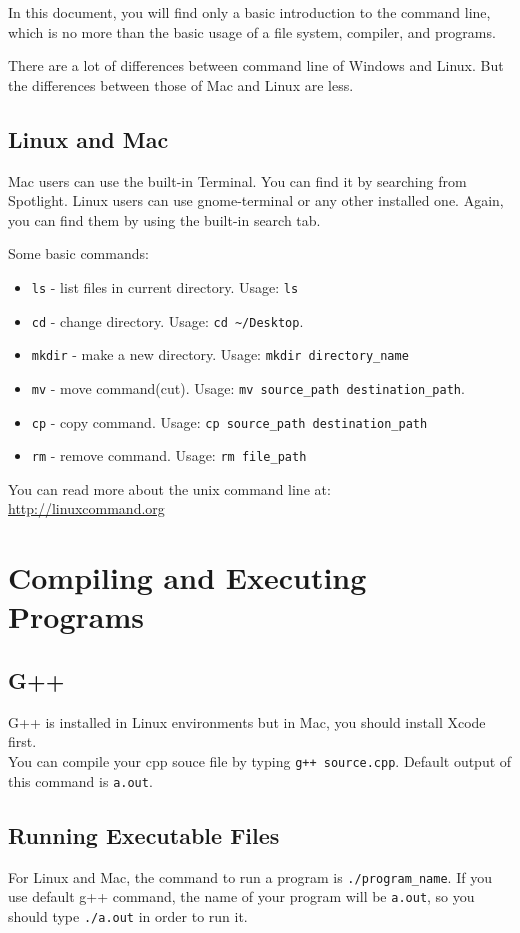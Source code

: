 \documentclass[12pt]{article}
\begin{document}
In this document, you will find only a basic introduction to the command line, which is no more than the basic usage of a file system, compiler, and programs.

There are a lot of differences between command line of Windows and Linux. But the differences between those of Mac and Linux are less.

\subsection{Linux and Mac}
Mac users can use the built-in Terminal. You can find it by searching from Spotlight. Linux users can use gnome-terminal or any other installed one. Again, you can find them by using the built-in search tab.

Some basic commands:
\begin{itemize}
  \item \texttt{ls} - list files in current directory. Usage: \texttt{ls}
  \item \texttt{cd} - change directory. Usage: \texttt{cd \textasciitilde/Desktop}.
  \item \texttt{mkdir} - make a new directory. Usage: \texttt{mkdir directory\_name}
  \item \texttt{mv} - move command(cut). Usage: \texttt{mv source\_path destination\_path}.
  \item \texttt{cp} - copy command. Usage: \texttt{cp source\_path destination\_path}
  \item \texttt{rm} - remove command. Usage: \texttt{rm file\_path}
\end{itemize}

You can read more about the unix command line at:\\
\url{http://linuxcommand.org}

\section{Compiling and Executing Programs}

\subsection{G++}
G++ is installed in Linux environments but in Mac, you should install Xcode first.\\
  You can compile your cpp souce file by typing \texttt{g++ source.cpp}. Default output of this command is \texttt{a.out}.

\subsection{Running Executable Files}
 For Linux and Mac, the command to run a program is \texttt{./program\_name}. If you use default g++ command, the name of your program will be \texttt{a.out}, so you should type \texttt{./a.out} in order to run it.
\end{document}
